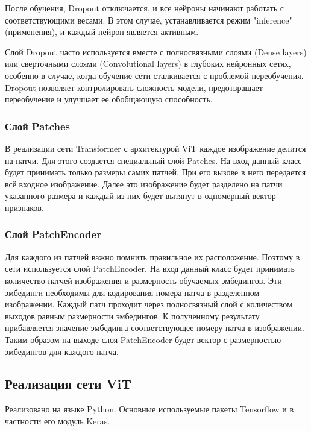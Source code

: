 \documentclass[14pt,a4paper]{extarticle}
\begin{document}
После обучения, Dropout отключается, и все нейроны начинают работать с соответствующими весами. В этом случае, устанавливается режим "inference" (применения), и каждый нейрон является активным.

Слой Dropout часто используется вместе с полносвязными слоями (Dense layers) или сверточными слоями (Convolutional layers) в глубоких нейронных сетях, особенно в случае, когда обучение сети сталкивается с проблемой переобучения. Dropout позволяет контролировать сложность модели, предотвращает переобучение и улучшает ее обобщающую способность.


\subsubsection*{Слой Patches}
В реализации сети Transformer с архитектурой ViT каждое изображение делится на патчи. Для этого создается специальный слой Patches. На вход данный класс будет принимать только размеры самих патчей. При его вызове в него передается всё входное изображение. Далее это изображение будет разделено на патчи указанного размера и каждый из них будет вытянут в одномерный вектор признаков.


\subsubsection*{Слой PatchEncoder}
Для каждого из патчей важно помнить правильное их расположение. Поэтому в сети используется слой PatchEncoder. На вход данный класс будет принимать количество патчей изображения и размерность обучаемых эмбедингов. Эти эмбединги необходимы для кодирования номера патча в разделенном изображении. Каждый патч проходит через полносвязный слой с количеством выходов равным размерности эмбедингов. К полученному результату прибавляется значение эмбединга соответствующее номеру патча в изображении. Таким образом на выходе слоя PatchEncoder будет вектор с размерностью эмбедингов для каждого патча.


\newpage
\subsection{Реализация сети ViT}
Реализовано на языке Python.
Основные используемые пакеты Tensorflow и в частности его модуль Keras.
\end{document}
